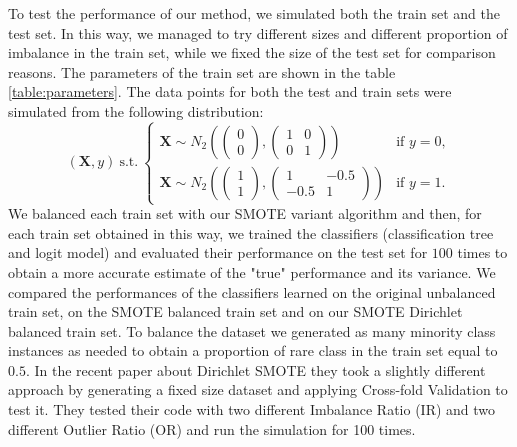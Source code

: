 \documentclass{article}
\begin{document}
To test the performance of our method, we simulated both the train set and the test set. In this way, we managed to try different sizes and different proportion of imbalance in the train set, while we fixed the size of the test set for comparison reasons. The parameters of the train set are shown in the table \ref{table:parameters}. The data points for both the test and train sets were simulated from the following distribution:
\begin{equation}
    (\mathbf{X}, y) \ \text{s.t.} \
    \begin{cases} 
        \mathbf{X} \sim N_2\left(
          \begin{pmatrix}
          0 \\ 0
          \end{pmatrix},
          \begin{pmatrix}
          1 & 0 \\ 
          0 & 1
          \end{pmatrix}
          \right) & \text{if } y = 0, \\
        \mathbf{X} \sim N_2\left(
          \begin{pmatrix}
          1 \\ 1
          \end{pmatrix},
          \begin{pmatrix}
          1 & -0.5 \\ 
          -0.5 & 1
          \end{pmatrix}
          \right) & \text{if } y = 1.
    \end{cases}
\end{equation}
We balanced each train set with our SMOTE variant algorithm and then, for each train set obtained in this way, we trained the classifiers (classification tree and logit model) and evaluated their performance on the test set for $100$ times to obtain a more accurate estimate of the "true" performance and its variance. We compared the performances of the classifiers learned on the original unbalanced train set, on the SMOTE balanced train set and on our SMOTE Dirichlet balanced train set. To balance the dataset we generated as many minority class instances as needed to obtain a proportion of rare class in the train set equal to $0.5$. In the recent paper about Dirichlet SMOTE \cite{matharaarachchi2024enhancing} they took a slightly different approach by generating a fixed size dataset and applying Cross-fold Validation to test it. They tested their code with two different Imbalance Ratio (IR) and two different Outlier Ratio (OR) and run the simulation for 100 times.
\end{document}
